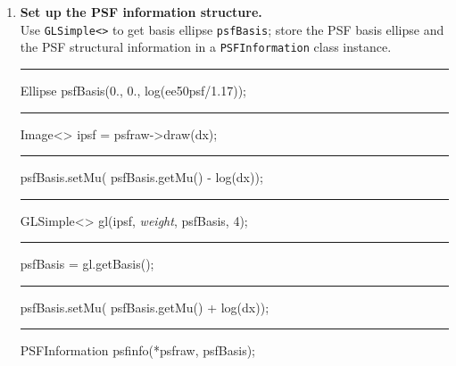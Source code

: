 \documentclass[useAMS,usenatbib,usegraphicx]{mn2e}
\begin{document}
\begin{enumerate}
\item {\bf Set up the PSF information structure.}  \\
Use {\tt GLSimple<>} to get basis ellipse {\tt psfBasis};
store the PSF basis ellipse and the PSF structural information in a {\tt PSFInformation} class
instance. \\
\begin{boxit}
  {\tt \rule{0.1in}{0in} Ellipse psfBasis(0., 0., log(ee50psf/1.17));\\
  \rule{0.1in}{0in} Image<> ipsf = psfraw->draw(dx); \\
  \rule{0.1in}{0in} psfBasis.setMu( psfBasis.getMu() - log(dx));\\
  \rule{0.1in}{0in} GLSimple<> gl(ipsf, {\it weight}, psfBasis, 4);\\
  \rule{0.1in}{0in} psfBasis = gl.getBasis();\\
  \rule{0.1in}{0in} psfBasis.setMu( psfBasis.getMu() + log(dx)); \\
  \rule{0.1in}{0in} PSFInformation psfinfo(*psfraw, psfBasis);} \\
\end{boxit}


\end{enumerate}
\end{document}
